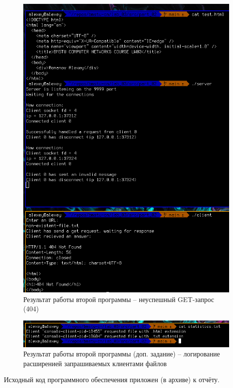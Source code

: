 \documentclass[12pt]{report}
\begin{document}
\begin{figure}[H]
	\begin{center}
		\includegraphics[scale=0.6]{img/prog_02_02.png}
	\end{center}
	\caption{Результат работы второй программы -- неуспешный GET-запрос (404)}
	\label{fig:prog_02_02}
\end{figure}

\begin{figure}[H]
	\begin{center}
		\includegraphics[scale=0.6]{img/prog_02_03.png}
	\end{center}
	\caption{Результат работы второй программы (доп. задание) -- логирование расширенией запрашиваемых клиентами файлов}
	\label{fig:prog_02_03}
\end{figure}

Исходный код программного обеспечения приложен (в архиве) к отчёту.



	
\end{document}
